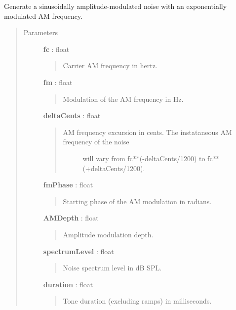 \documentclass[a4paper,12pt,english]{sphinxmanual}
\begin{document}
\begin{fulllineitems}
\label{sndlib:sndlib.expAMNoise}
Generate a sinusoidally amplitude-modulated noise with an exponentially
modulated AM frequency.
\begin{quote}\begin{description}
\item[{Parameters }] \leavevmode
\textbf{fc} : float
\begin{quote}

Carrier AM frequency in hertz.
\end{quote}

\textbf{fm} : float
\begin{quote}

Modulation of the AM frequency in Hz.
\end{quote}

\textbf{deltaCents} : float
\begin{quote}
\begin{description}
\item[{AM frequency excursion in cents. The instataneous AM frequency of the noise}] \leavevmode
will vary from fc**(-deltaCents/1200) to fc**(+deltaCents/1200).

\end{description}
\end{quote}

\textbf{fmPhase} : float
\begin{quote}

Starting phase of the AM modulation in radians.
\end{quote}

\textbf{AMDepth} : float
\begin{quote}

Amplitude modulation depth.
\end{quote}

\textbf{spectrumLevel} : float
\begin{quote}

Noise spectrum level in dB SPL.
\end{quote}

\textbf{duration} : float
\begin{quote}

Tone duration (excluding ramps) in milliseconds.
\end{quote}


\end{description}
\end{quote}
\end{fulllineitems}
\end{document}
